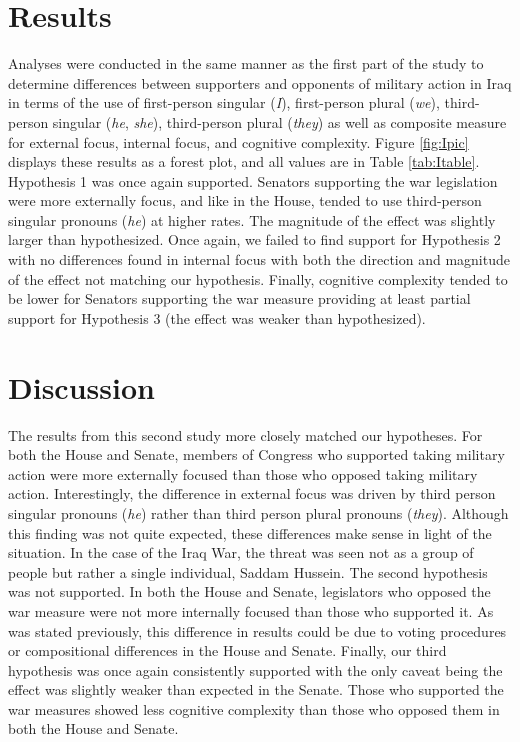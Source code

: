 \documentclass[english,,man]{apa6}
\begin{document}
\hypertarget{results-3}{%
\section{Results}\label{results-3}}

Analyses were conducted in the same manner as the first part of the study to determine differences between supporters and opponents of military action in Iraq in terms of the use of first-person singular (\emph{I}), first-person plural (\emph{we}), third-person singular (\emph{he}, \emph{she}), third-person plural (\emph{they}) as well as composite measure for external focus, internal focus, and cognitive complexity. Figure \ref{fig:Ipic} displays these results as a forest plot, and all values are in Table \ref{tab:Itable}. Hypothesis 1 was once again supported. Senators supporting the war legislation were more externally focus, and like in the House, tended to use third-person singular pronouns (\emph{he}) at higher rates. The magnitude of the effect was slightly larger than hypothesized. Once again, we failed to find support for Hypothesis 2 with no differences found in internal focus with both the direction and magnitude of the effect not matching our hypothesis. Finally, cognitive complexity tended to be lower for Senators supporting the war measure providing at least partial support for Hypothesis 3 (the effect was weaker than hypothesized).

\hypertarget{discussion-1}{%
\section{Discussion}\label{discussion-1}}

The results from this second study more closely matched our hypotheses. For both the House and Senate, members of Congress who supported taking military action were more externally focused than those who opposed taking military action. Interestingly, the difference in external focus was driven by third person singular pronouns (\emph{he}) rather than third person plural pronouns (\emph{they}). Although this finding was not quite expected, these differences make sense in light of the situation. In the case of the Iraq War, the threat was seen not as a group of people but rather a single individual, Saddam Hussein. The second hypothesis was not supported. In both the House and Senate, legislators who opposed the war measure were not more internally focused than those who supported it. As was stated previously, this difference in results could be due to voting procedures or compositional differences in the House and Senate. Finally, our third hypothesis was once again consistently supported with the only caveat being the effect was slightly weaker than expected in the Senate. Those who supported the war measures showed less cognitive complexity than those who opposed them in both the House and Senate.
\end{document}
